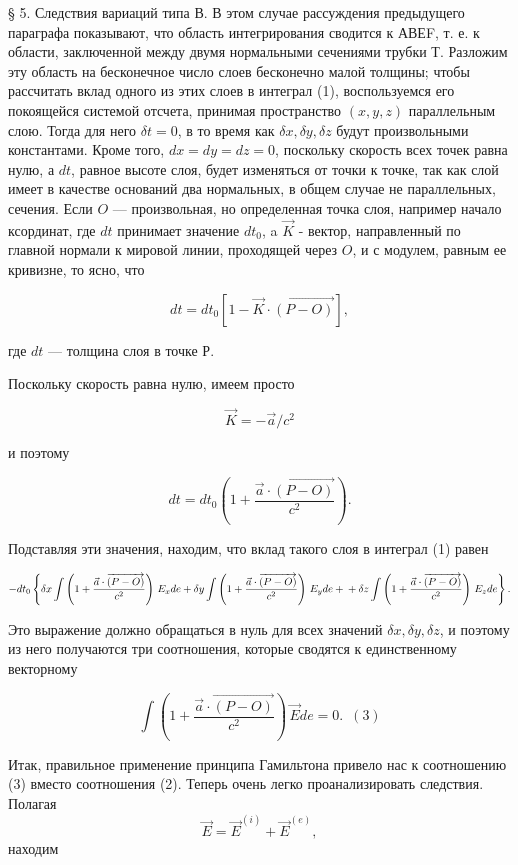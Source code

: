 \documentclass[11pt]{article}
\begin{document}
    § 5. Следствия вариаций типа В. В этом случае рассуждения предыдущего
параграфа показывают, что область интегрирования сводится к АВЕF, т. е.
к области, заключенной между двумя нормальными сечениями трубки Т.
Разложим эту область на бесконечное число слоев бесконечно малой
толщины; чтобы рассчитать вклад одного из этих слоев в интеграл (1),
воспользуемся его покоящейся системой отсчета, принимая пространство
\((x,y,z)\) параллельным слою. Тогда для него \(\delta t = 0\), в то
время как \(\delta x, \delta y, \delta z\) будут произвольными
константами. Кроме того, \(dx = dy = dz = 0\), поскольку скорость всех
точек равна нулю, а \(dt\), равное высоте слоя, будет изменяться от
точки к точке, так как слой имеет в качестве оснований два нормальных, в
общем случае не параллельных, сечения. Если \(O\) --- произвольная, но
определенная точка слоя, например начало ксординат, где \(dt\) принимает
значение \(dt_0\), a \(\vec K\) - вектор, направленный по главной
нормали к мировой линии, проходящей через \(O\), и с модулем, равным ее
кривизне, то ясно, что

\[dt = dt_0 \left[1 - \vec K \cdot \overrightarrow{\left(P - O\right)}\right],\]

где \(dt\) --- толщина слоя в точке Р.

    Поскольку скорость равна нулю, имеем просто

\[\vec {K} = - \vec {a}/c^2\]

и поэтому

\[ dt = dt_0\left (1 + \frac{\vec {a} \cdot \overrightarrow{\left(P - O\right)}}{c^2}\right).\]

    Подставляя эти значения, находим, что вклад такого слоя в интеграл (1)
равен

\[ - dt_0\left\{
\delta x \int \left (1 + \frac{\vec {a} \cdot \overrightarrow{\left(P - O\right)}}{c^2}\right)\, E_x de
+
\delta y \int \left (1 + \frac{\vec {a} \cdot \overrightarrow{\left(P - O\right)}}{c^2}\right)\, E_y de
+ \\ +
\delta z \int \left (1 + \frac{\vec {a} \cdot \overrightarrow{\left(P - O\right)}}{c^2}\right)\, E_z de
\right\}.\]

Это выражение должно обращаться в нуль для всех значений
\(\delta x, \delta y, \delta z\), и поэтому из него получаются три
соотношения, которые сводятся к единственному векторному

\[\int \left (1 + \frac{\vec {a} \cdot \overrightarrow{\left(P - O\right)}}{c^2}\right)\, \vec E de = 0.\,\,\,(3)\]

    Итак, правильное применение принципа Гамильтона привело нас к
соотношению (3) вместо соотношения (2). Теперь очень легко
проанализировать следствия. Полагая
\[\vec {E} = {\vec {E}}^{(i)} + {\vec {E}}^{(e)},\] находим
\end{document}
